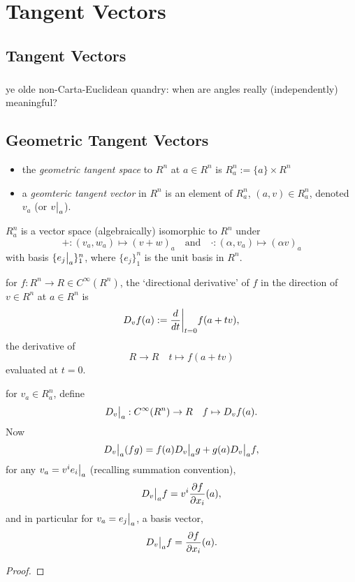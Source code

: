 \chapter{Tangent Vectors}

\section{Tangent Vectors}
\paragraph{}
ye olde non-Carta-Euclidean quandry:
when are angles really (independently) meaningful?

\section{Geometric Tangent Vectors}

\begin{defn}
  \begin{itemize}
  \item
    the \emph{geometric tangent space} to $R^n$ at $a\in R^n$ is
    $R^n_a:=\{a\}\times R^n$
  \item
    a \emph{geomteric tangent vector} in $R^n$ is
    an element of $R^n_a$,
    $(a, v)\in R^n_a$, denoted $v_a$ (or $\restr{v}{a}$).
  \end{itemize}
\end{defn}

\begin{rem}{}
  $R^n_a$ is a vector space (algebraically) isomorphic to $R^n$ under
  \[
  +: (v_a, w_a)\mapsto (v+w)_a
  \quad\text{and}\quad
  \cdot: (\alpha, v_a)\mapsto(\alpha v)_a
  \]
  with basis $\{\restr{e_j}{a}\}_1^n$, where
  $\{e_j\}_1^n$ is the unit basis in $R^n$.
\end{rem}

\begin{defn}
  for $f:R^n\rightarrow R\in C^\infty(R^n)$,
  the `directional derivative' of $f$
  in the direction of $v\in R^n$ at $a\in R^n$ is
  \[
  D_vf(a):=\restr{\frac{d}{dt}}{t=0} f(a+tv),
  \]
  the derivative of
  \[ R\rightarrow R\quad t\mapsto f(a+tv) \]
  evaluated at $t=0$.
\end{defn}

\begin{rem}{}
  for $v_a\in R^n_a$, define
  \[
  \restr{D_v}{a}:C^\infty(R^n)\rightarrow R \quad f\mapsto D_vf(a).
  \]
  Now
  \[
  \restr{D_v}{a}(fg) = f(a)\restr{D_v}{a}g + g(a)\restr{D_v}{a}f,
  \]
  for any $v_a=v^i\restr{e_i}{a}$ (recalling summation convention),
  \[
  \restr{D_v}{a} f = v^i\frac{\partial f}{\partial x_i}(a),
  \]
  and in particular for $v_a=\restr{e_j}{a}$, a basis vector,
  \[
  \restr{D_v}{a} f = \frac{\partial f}{\partial x_i}(a).
  \]
\end{rem}
\begin{proof}
\end{proof}

